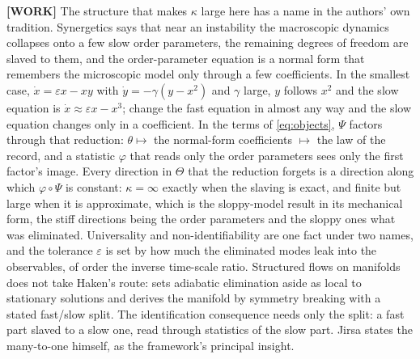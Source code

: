 \documentclass[11pt]{article}
\newcommand{\WORK}[1]{\textcolor{orange!85!red}{\textbf{[WORK]} #1}}
\begin{document}
\WORK{The structure that makes $\kappa$ large here has a name in the authors' own tradition. Synergetics \parencite{haken1983,jirsa1996} says that near an instability the macroscopic dynamics collapses onto a few slow order parameters, the remaining degrees of freedom are slaved to them, and the order-parameter equation is a normal form that remembers the microscopic model only through a few coefficients. In the smallest case, $\dot x=\varepsilon x-xy$ with $\dot y=-\gamma(y-x^2)$ and $\gamma$ large, $y$ follows $x^2$ and the slow equation is $\dot x\approx\varepsilon x-x^3$; change the fast equation in almost any way and the slow equation changes only in a coefficient. In the terms of \eqref{eq:objects}, $\Psi$ factors through that reduction: $\theta\mapsto$ the normal-form coefficients $\mapsto$ the law of the record, and a statistic $\varphi$ that reads only the order parameters sees only the first factor's image. Every direction in $\Theta$ that the reduction forgets is a direction along which $\varphi\circ\Psi$ is constant: $\kappa=\infty$ exactly when the slaving is exact, and finite but large when it is approximate, which is the sloppy-model result in its mechanical form, the stiff directions being the order parameters and the sloppy ones what was eliminated. Universality and non-identifiability are one fact under two names, and the tolerance $\varepsilon$ is set by how much the eliminated modes leak into the observables, of order the inverse time-scale ratio. Structured flows on manifolds does not take Haken's route: \textcite{jirsa2020} sets adiabatic elimination aside as local to stationary solutions and derives the manifold by symmetry breaking with a stated fast/slow split. The identification consequence needs only the split: a fast part slaved to a slow one, read through statistics of the slow part. Jirsa states the many-to-one himself, as the framework's principal insight.}
\end{document}
